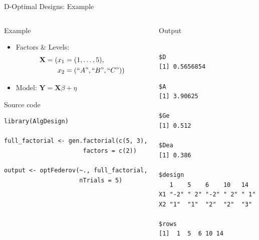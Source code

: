 \documentclass[10pt, compress, aspectratio=169, xcolor={table,usenames,dvipsnames}]{beamer}
\begin{document}
\begin{frame}[fragile,label={sec:orgfb87477}]{D-Optimal Designs: Example}
 \begin{columns}
\begin{column}{0.6\columnwidth}
\begin{block}{Example}
\begin{itemize}
\item Factors \& Levels:
\begin{align*}
\mathbf{X} = (x_1 = & \; (1, \dots, 5), \\
x_2 = & \; (``A", ``B", ``C"))
\end{align*}
\item Model: \(\mathbf{Y} = \mathbf{X}\beta + \eta\)
\end{itemize}

\begin{block}{Source code}
\vspace{-.2cm}

\lstset{language=r,label= ,caption= ,captionpos=b,numbers=none}
\begin{lstlisting}
library(AlgDesign)

full_factorial <- gen.factorial(c(5, 3),
                      factors = c(2))

output <- optFederov(~., full_factorial,
                     nTrials = 5)
\end{lstlisting}
\end{block}
\end{block}
\end{column}

\begin{column}{0.4\columnwidth}
\begin{block}{Output}
\vspace{-.2cm}
\scriptsize

\begin{verbatim}

$D
[1] 0.5656854

$A
[1] 3.90625

$Ge
[1] 0.512

$Dea
[1] 0.386

$design
   1    5    6    10   14
X1 "-2" " 2" "-2" " 2" " 1"
X2 "1"  "1"  "2"  "2"  "3"

$rows
[1]  1  5  6 10 14
\end{verbatim}


\normalsize
\end{block}
\end{column}
\end{columns}
\end{frame}
\end{document}
